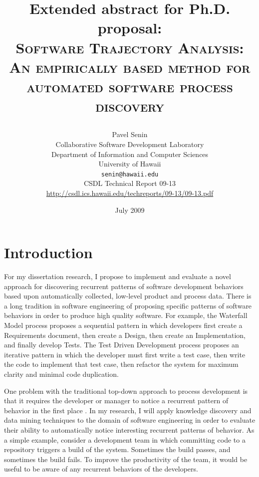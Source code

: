 \documentclass[11pt,oneside]{article}
\begin{document}
\title{Extended abstract for Ph.D. proposal: \\
       \textsc{Software Trajectory Analysis:} \\
       \textsc{An empirically based method for automated software process discovery} \\
       \author{Pavel Senin \\
							 Collaborative Software Development Laboratory \\
               Department of Information and Computer Sciences \\
               University of Hawaii \\[0.3cm]
               \texttt{senin@hawaii.edu} \\[0.3cm]
               CSDL Technical Report 09-13 \\
               \url{http://csdl.ics.hawaii.edu/techreports/09-13/09-13.pdf}
       }
       \date{July 2009}
}
\maketitle

\clearpage


\section{Introduction}
For my dissertation research, I propose to implement and evaluate a novel approach for discovering recurrent patterns of software development behaviors based upon automatically collected, low-level product and process data. There is a long tradition in software engineering of proposing specific patterns of software behaviors in order to produce high quality software. For example, the Waterfall Model process proposes a sequential pattern in which developers first create a Requirements document, then create a Design, then create an Implementation, and finally develop Tests. The Test Driven Development process proposes an iterative pattern in which the developer must first write a test case, then write the code to implement that test case, then refactor the system for maximum clarity and minimal code duplication.

One problem with the traditional top-down approach to process development is that it requires the developer or manager to notice a recurrent pattern of behavior in the first place \cite{citeulike:5043104}. In my research, I will apply knowledge discovery and data mining techniques to the domain of software engineering in order to evaluate their ability to automatically notice interesting recurrent patterns of behavior. As a simple example, consider a development team in which committing code to a repository triggers a build of the system. Sometimes the build passes, and sometimes the build fails. To improve the productivity of the team, it would be useful to be aware of any recurrent behaviors of the developers. 
\end{document}
